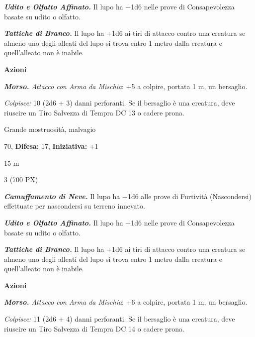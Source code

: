 \begin{multicols}{2}
{\emph{\textbf{Udito e Olfatto Affinato.}} Il lupo ha +1d6 nelle prove di Consapevolezza basate su udito o olfatto.

\emph{\textbf{Tattiche di Branco.}} Il lupo ha +1d6 ai tiri di attacco contro una creatura se almeno uno degli alleati del lupo si trova entro 1 metro dalla creatura e quell'alleato non è inabile.

\textbf{Azioni}

\emph{\textbf{Morso.} Attacco con Arma da Mischia}: +5 a colpire, portata 1 m, un bersaglio.

\emph{Colpisce:} 10 (2d6 + 3) danni perforanti. Se il bersaglio è una creatura, deve riuscire un Tiro Salvezza di Tempra DC 13 o cadere prona.

\begin{description}[noitemsep, topsep=0pt, parsep=0pt, partopsep=0pt, leftmargin=0cm, labelwidth=2.2cm]
    \item[\textbf{Taglia/Tipo:}] Grande mostruosità, malvagio
    \item[\textbf{Caratt.:}] 
    \item[\textbf{Punti Ferita:}] 70,  \textbf{Difesa:} 17,  \textbf{Iniziativa:} +1
    \item[\textbf{Tiri Salvez.:}] 
    \item[\textbf{Movimento:}] 15 m
    \item[\textbf{Sfida:}] 3 (700 PX)\smallskip
\end{description}

\emph{\textbf{Camuffamento di Neve.}} Il lupo ha +1d6 alle prove di Furtività (Nascondersi) effettuate per nascondersi su terreno innevato.

\emph{\textbf{Udito e Olfatto Affinato.}} Il lupo ha +1d6 nelle prove di Consapevolezza basate su udito o olfatto.

\emph{\textbf{Tattiche di Branco.}} Il lupo ha +1d6 ai tiri di attacco contro una creatura se almeno uno degli alleati del lupo si trova entro 1 metro dalla creatura e quell'alleato non è inabile.

\textbf{Azioni}

\emph{\textbf{Morso.} Attacco con Arma da Mischia}: +6 a colpire, portata 1 m, un bersaglio.

\emph{Colpisce:} 11 (2d6 + 4) danni perforanti. Se il bersaglio è una creatura, deve riuscire un Tiro Salvezza di Tempra DC 14 o cadere prona.

}
\end{multicols}
